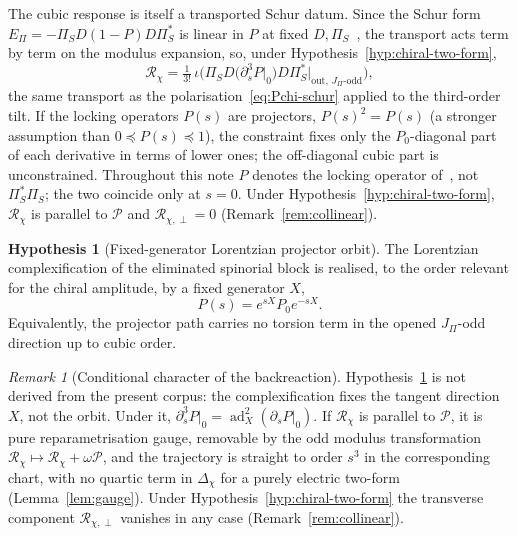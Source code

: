 \documentclass[11pt]{article}
\theoremstyle{definition}
\newtheorem{hypothesis}{Hypothesis}
\theoremstyle{remark}
\newtheorem{remark}{Remark}
\newcommand{\JPi}{J_{\Pi}}
\newcommand{\Pchi}{\mathcal{P}}
\newcommand{\Dchi}{\Delta_{\chi}}
\newcommand{\Epi}{E_{\Pi}}
\begin{document}
    The cubic response is itself a transported Schur datum.
    Since the Schur form $\Epi = -\Pi_S D (1 - P) D \Pi_S^*$ is linear in $P$ at fixed $D, \Pi_S$~\cite{Beau2026prs},
    the transport acts term by term on the modulus expansion, so, under Hypothesis~\ref{hyp:chiral-two-form},
    \begin{equation}
      \label{eq:Rchi-transport}
      \mathcal{R}_{\chi} = \tfrac{1}{3!}\, \iota\Big(\Pi_S D \big(\partial_s^3 P|_{0}\big) D \Pi_S^*
      \big|_{\mathrm{out},\,\JPi\text{-odd}}\Big) ,
    \end{equation}
    the same transport as the polarisation~\eqref{eq:Pchi-schur} applied to the third-order tilt.
    If the locking operators $P(s)$ are projectors, $P(s)^2=P(s)$ (a stronger assumption than $0\preceq P(s)\preceq1$),
    the constraint fixes only the $P_0$-diagonal part of each derivative in terms of lower ones; the off-diagonal cubic
    part is unconstrained.
    Throughout this note $P$ denotes the locking operator of~\cite{Beau2026prs}, not $\Pi_S^*\Pi_S$; the two coincide
    only at $s=0$.
    Under Hypothesis~\ref{hyp:chiral-two-form}, $\mathcal R_\chi$ is parallel to $\Pchi$ and $\mathcal R_{\chi,\perp}=0$
    (Remark~\ref{rem:collinear}).

    \begin{hypothesis}[Fixed-generator Lorentzian projector orbit]
      \label{hyp:fixed-generator-orbit}
      The Lorentzian complexification of the eliminated spinorial block is realised, to the order relevant for the
      chiral amplitude, by a fixed generator $X$,
      \[
        P(s) = e^{sX} P_0 e^{-sX} .
      \]
      Equivalently, the projector path carries no torsion term in the opened $\JPi$-odd direction up to cubic order.
    \end{hypothesis}

    \begin{remark}[Conditional character of the backreaction]
      \label{rem:conditional-sign}
      Hypothesis~\ref{hyp:fixed-generator-orbit} is not derived from the present corpus: the complexification fixes
      the tangent direction $X$, not the orbit.
      Under it, $\partial_s^3 P|_{0} = \operatorname{ad}_X^2(\partial_s P|_{0})$.
      If $\mathcal{R}_{\chi}$ is parallel to $\Pchi$, it is pure reparametrisation gauge, removable by the odd modulus
      transformation $\mathcal{R}_{\chi} \mapsto \mathcal{R}_{\chi} + \omega \Pchi$, and the trajectory is straight to
      order $s^3$ in the corresponding chart, with no quartic term in $\Dchi$ for a purely electric two-form
      (Lemma~\ref{lem:gauge}).
      Under Hypothesis~\ref{hyp:chiral-two-form} the transverse component $\mathcal{R}_{\chi,\perp}$ vanishes in any
      case (Remark~\ref{rem:collinear}).
    \end{remark}
\end{document}
